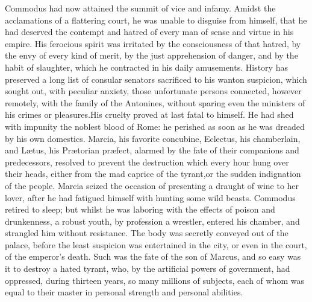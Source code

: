 





Commodus had now attained the summit of vice and infamy. Amidst
the acclamations of a flattering court, he was unable to disguise
from himself, that he had deserved the contempt and hatred of
every man of sense and virtue in his empire. His ferocious spirit
was irritated by the consciousness of that hatred, by the envy of
every kind of merit, by the just apprehension of danger, and by
the habit of slaughter, which he contracted in his daily
amusements. History has preserved a long list of consular
senators sacrificed to his wanton suspicion, which sought out,
with peculiar anxiety, those unfortunate persons connected,
however remotely, with the family of the Antonines, without
sparing even the ministers of his crimes or pleasures.\footnotemark[43] His
cruelty proved at last fatal to himself. He had shed with
impunity the noblest blood of Rome: he perished as soon as he was
dreaded by his own domestics. Marcia, his favorite concubine,
Eclectus, his chamberlain, and Lætus, his Prætorian præfect,
alarmed by the fate of their companions and predecessors,
resolved to prevent the destruction which every hour hung over
their heads, either from the mad caprice of the tyrant,\footnotemark[431] or
the sudden indignation of the people. Marcia seized the occasion
of presenting a draught of wine to her lover, after he had
fatigued himself with hunting some wild beasts. Commodus retired
to sleep; but whilst he was laboring with the effects of poison
and drunkenness, a robust youth, by profession a wrestler,
entered his chamber, and strangled him without resistance. The
body was secretly conveyed out of the palace, before the least
suspicion was entertained in the city, or even in the court, of
the emperor’s death. Such was the fate of the son of Marcus, and
so easy was it to destroy a hated tyrant, who, by the artificial
powers of government, had oppressed, during thirteen years, so
many millions of subjects, each of whom was equal to their master
in personal strength and personal abilities.\footnotemark[44]

